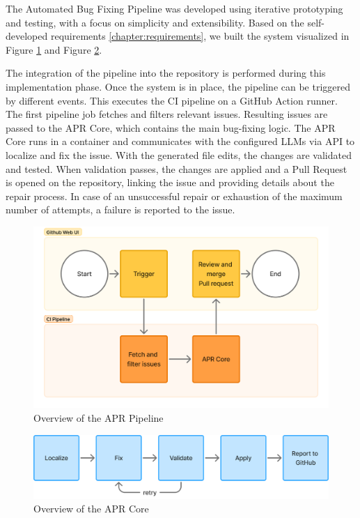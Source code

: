 The Automated Bug Fixing Pipeline was developed using iterative prototyping and testing, with a focus on simplicity and extensibility. Based on the self-developed requirements \ref{chapter:requirements}, we built the system visualized in Figure \ref{fig:high-level} and Figure \ref{fig:apr-core-overview}.

The integration of the pipeline into the repository is performed during this implementation phase. Once the system is in place, the pipeline can be triggered by different events. This executes the CI pipeline on a GitHub Action runner. The first pipeline job fetches and filters relevant issues. Resulting issues are passed to the APR Core, which contains the main bug-fixing logic. The APR Core runs in a container and communicates with the configured \acp{LLM} via API to localize and fix the issue. With the generated file edits, the changes are validated and tested. When validation passes, the changes are applied and a Pull Request is opened on the repository, linking the issue and providing details about the repair process. In case of an unsuccessful repair or exhaustion of the maximum number of attempts, a failure is reported to the issue.

\begin{figure}[H]
    \centering
    \includegraphics[width=1\textwidth]{images/flowcharts/overview.png}
    \caption{Overview of the APR Pipeline}
    \label{fig:high-level}
\end{figure}

\begin{figure}[H]
    \centering
    \includegraphics[width=1\textwidth]{images/flowcharts/apr_core_overview.png}
    \caption{Overview of the APR Core}
    \label{fig:apr-core-overview}
\end{figure}



